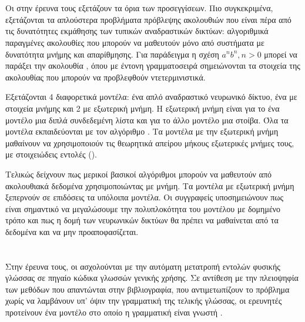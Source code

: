 \section{}

Οι  \cite{Joulin2015} στην έρευνα τους εξετάζουν τα όρια των  προσεγγίσεων.
Πιο συγκεκριμένα, εξετάζονται τα απλούστερα προβλήματα πρόβλεψης ακολουθιών που είναι πέρα από τις δυνατότητες εκμάθησης των τυπικών αναδραστικών δικτύων: αλγοριθμικά παραγμένες ακολουθίες που μπορούν να μαθευτούν μόνο από συστήματα με δυνατότητα μνήμης και απαρίθμησης.
Για παράδειγμα η σχέση $a^nb^n, n > 0$ μπορεί να παράξει την ακολουθία , όπου με έντονη γραμματοσειρά σημειώνονται τα στοιχεία της ακολουθίας που μπορούν να προβλεφθούν ντετερμινιστικά.

Εξετάζονται 4 διαφορετικά μοντέλα: ένα απλό αναδραστικό νευρωνικό δίκτυο, ένα  με στοιχεία μνήμης  και 2  με εξωτερική μνήμη.
Η εξωτερική μνήμη είναι για το ένα μοντέλο μια διπλά συνδεδεμένη λίστα και για το άλλο μοντέλο μια στοίβα. Όλα τα μοντέλα εκπαιδεύονται με τον αλγόριθμο .
Τα μοντέλα με την εξωτερική μνήμη μαθαίνουν να χρησιμοποιούν τις θεωρητικά απείρου μήκους εξωτερικές μνήμες τους, με στοιχειώδεις εντολές (). 

Τελικώς δείχνουν πως μερικοί βασικοί αλγόριθμοι μπορούν να μαθευτούν από ακολουθιακά δεδομένα χρησιμοποιώντας  με μνήμη. Τα μοντέλα με εξωτερική μνήμη ξεπερνούν σε επιδόσεις τα υπόλοιπα μοντέλα. Οι συγγραφείς υποσημειώνουν πως είναι σημαντικό να μεγαλώσουμε την πολυπλοκότητα του μοντέλου με δομημένο τρόπο και πως η δομή των νευρωνικών δικτύων θα πρέπει να μαθαίνεται από τα δεδομένα και να μην προαποφασίζεται.

\section{}

Στην έρευνα τους, οι  \cite{Yin2017} ασχολούνται με την αυτόματη μετατροπή εντολών φυσικής γλώσσας σε πηγαίο κώδικα γλωσσών γενικής χρήσης.
Σε αντίθεση με την πλειοψηφία των μεθόδων που απαντώνται στην βιβλιογραφία, που αντιμετωπίζουν το πρόβλημα χωρίς να λαμβάνουν υπ' όψιν την γραμματική της τελικής γλώσσας, οι ερευνητές προτείνουν ένα μοντέλο στο οποίο η γραμματική είναι γνωστή .

